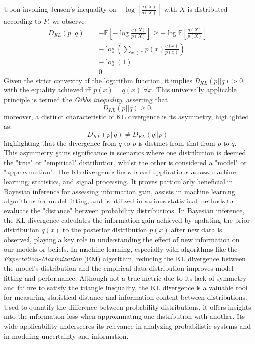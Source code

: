 \documentclass[12pt]{article}
\begin{document}
		Upon invoking Jensen's inequality on \(-\log\left[\frac{q(X)}{p(X)} \right]\) with \(X\) is distributed according to \(P\), we observe:
		\begin{align}
			D_{KL}(p||q) & = - \mathbb{E} \left[-\log\frac{q(X)}{p(X)} \right] \geq -\log  \mathbb{E}  \left[\frac{q(X)}{p(X)} \right] \\
			& = - \log \left(  \sum_{x \in X}  p(x) \frac{q(x)}{p(x)}\right) \\
			& = - \log(1) \\
			& = 0
		\end{align}
		Given the strict convexity of the logarithm function, it implies \(D_{KL}(p||q) > 0\), with the equality achieved iff \(p(x) = q(x)\) \( \forall x\). This universally applicable principle is termed the \emph{Gibbs inequality}, asserting that
		\[ D_{KL}(p||q) \geq 0. \]
		moreover, a distinct characteristic of KL divergence is its asymmetry, highlighted as:
		\begin{equation}
			D_{KL}(p||q) \neq D_{KL}(q||p)
		\end{equation}
		highlighting that the divergence from \(q\) to \(p\) is distinct from that from \(p\) to \(q\). This asymmetry gains significance in scenarios where one distribution is deemed the "true" or "empirical" distribution, whilst the other is considered a "model" or "approximation". The KL divergence finds broad applications across machine learning, statistics, and signal processing. It proves particularly beneficial in Bayesian inference for assessing information gain, assists in machine learning algorithms for model fitting, and is utilized in various statistical methods to evaluate the "distance" between probability distributions. In Bayesian inference, the KL divergence calculates the information gain achieved by updating the prior distribution \(q(x)\) to the posterior distribution \(p(x)\) after new data is observed, playing a key role in understanding the effect of new information on our models or beliefs. In machine learning, especially with algorithms like the \emph{Expectation-Maximization} (EM) algorithm, reducing the KL divergence between the model's distribution and the empirical data distribution improves model fitting and performance. Although not a true metric due to its lack of symmetry and failure to satisfy the triangle inequality, the KL divergence is a valuable tool for measuring statistical distance and information content between distributions. Used to quantify the difference between probability distributions, it offers insights into the information loss when approximating one distribution with another. Its wide applicability underscores its relevance in analyzing probabilistic systems and in modeling uncertainty and information.
		
\end{document}
